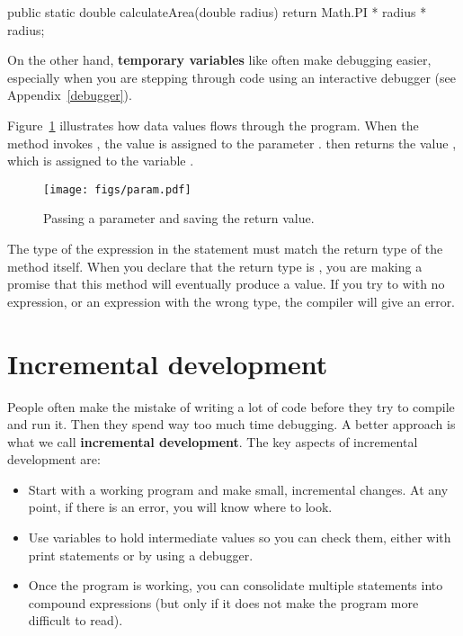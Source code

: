\begin{code}
public static double calculateArea(double radius) {
    return Math.PI * radius * radius;
}
\end{code}


On the other hand, {\bf temporary variables} like  often make debugging easier, especially when you are stepping through code using an interactive debugger (see Appendix~\ref{debugger}).

Figure~\ref{fig.param} illustrates how data values flows through the program.
When the  method invokes , the value  is assigned to the parameter .
 then returns the value , which is assigned to the variable .

\begin{figure}[!ht]
\begin{center}
\texttt{[image: figs/param.pdf]}
\caption{Passing a parameter and saving the return value.}
\label{fig.param}
\end{center}
\end{figure}

The type of the expression in the  statement must match the return type of the method itself.
When you declare that the return type is , you are making a promise that this method will eventually produce a  value.
If you try to  with no expression, or  an expression with the wrong type, the compiler will give an error.


\section{Incremental development}
\label{distance}


People often make the mistake of writing a lot of code before they try to compile and run it.
Then they spend way too much time debugging.
A better approach is what we call {\bf incremental development}.
The key aspects of incremental development are:

\begin{itemize}

\item Start with a working program and make small, incremental changes.
At any point, if there is an error, you will know where to look.

\item Use variables to hold intermediate values so you can check them, either with print statements or by using a debugger.

\item Once the program is working, you can consolidate multiple statements into compound expressions (but only if it does not make the program more difficult to read).

\end{itemize}

